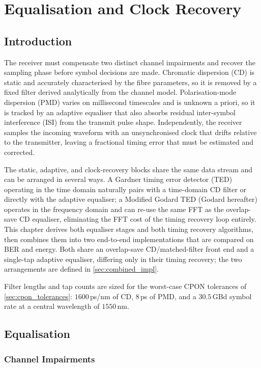 \documentclass[12pt,a4paper]{report}
\begin{document}
\chapter{Equalisation and Clock Recovery}\label{chapter:equalisation}
\section{Introduction}
The receiver must compensate two distinct channel impairments and recover the sampling phase before symbol decisions are made. Chromatic dispersion (CD) is static and accurately characterised by the fibre parameters, so it is removed by a fixed filter derived analytically from the channel model. Polarisation-mode dispersion (PMD) varies on millisecond timescales and is unknown a priori, so it is tracked by an adaptive equaliser that also absorbs residual inter-symbol interference (ISI) from the transmit pulse shape. Independently, the receiver samples the incoming waveform with an unsynchronised clock that drifts relative to the transmitter, leaving a fractional timing error that must be estimated and corrected.

The static, adaptive, and clock-recovery blocks share the same data stream and can be arranged in several ways. A Gardner timing error detector (TED) operating in the time domain naturally pairs with a time-domain CD filter or directly with the adaptive equaliser; a Modified Godard TED (Godard hereafter) operates in the frequency domain and can re-use the same FFT as the overlap-save CD equaliser, eliminating the FFT cost of the timing recovery loop entirely. This chapter derives both equaliser stages and both timing recovery algorithms, then combines them into two end-to-end implementations that are compared on BER and energy. Both share an overlap-save CD/matched-filter front end and a single-tap adaptive equaliser, differing only in their timing recovery; the two arrangements are defined in \cref{sec:combined_impl}.

Filter lengths and tap counts are sized for the worst-case CPON tolerances of \cref{sec:cpon_tolerances}: $1600$\,ps/nm of CD, $8$\,ps of PMD, and a $30.5$\,GBd symbol rate at a central wavelength of $1550$\,nm.

\section{Equalisation}
\subsection{Channel Impairments}
\end{document}

